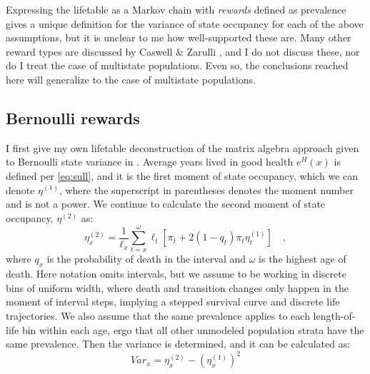 \documentclass[a4paper]{article}
\begin{document}
Expressing the lifetable as a Markov chain with \emph{rewards} defined as prevalence gives a unique definition for the variance of state occupancy for each of the above assumptions, but it is unclear to me how well-supported these are. Many other reward types are discussed by Caswell \& Zarulli \cite{caswell2018matrix}, and I do not discuss these, nor do I treat the case of multistate populations. Even so, the conclusions reached here will generalize to the case of multistate populations.


\subsection*{Bernoulli rewards}
I first give my own lifetable deconstruction of the matrix algebra approach given to Bernoulli state variance in \cite{caswell2018matrix}. Average years lived in good health $e^H(x)$ is defined per \eqref{eq:sull}, and it is the first moment of state occupancy, which we can denote $\eta^{(1)}$, where the superscript in parentheses denotes the moment number and is not a power. We continue to calculate the second moment of state occupancy, $\eta^{(2)}$ as:
\begin{equation}
\label{eq:bern2}
\eta^{(2)}_x = \frac{1}{\ell_x} \sum_{t=x}^\omega \ell_t\left[\pi_t + 2(1-q_t)\pi_t\eta^{(1)}_t\right] \quad \mathrm{,}
\end{equation}
where $q_x$ is the probability of death in the interval and $\omega$ is the highest age of death. Here notation omits intervals, but we assume to be working in discrete bins of uniform width, where death and transition changes only happen in the moment of interval steps, implying a stepped survival curve and discrete life trajectories. We also assume that the same prevalence applies to each length-of-life bin within each age, ergo that all other unmodeled population strata have the same prevalence. Then the variance is determined, and it can be calculated as:
\begin{equation}
\label{eq:var2}
Var_x = \eta^{(2)}_x - (\eta^{(1)}_x)^2
\end{equation}
\end{document}
